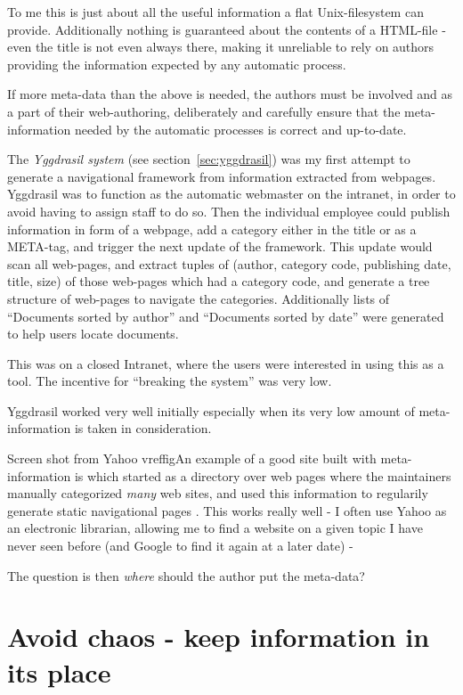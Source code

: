 To me this is just about all the useful information a flat
Unix-filesystem can provide.  Additionally nothing is guaranteed about
the contents of a HTML-file - even the title is not even always
there, making it unreliable to rely on authors providing the
information expected by any automatic process.

If more meta-data than the above is needed, the authors must be
involved and as a part of their web-authoring, deliberately and
carefully ensure that the meta-information needed by the automatic
processes is correct and up-to-date.

The \textit{Yggdrasil system} (see section~\vref{sec:yggdrasil}) was
my first attempt to generate a navigational framework from information
extracted from webpages.  Yggdrasil was to function as the automatic
webmaster on the intranet, in order to avoid having to assign staff to
do so.  Then the individual employee could publish information in form
of a webpage, add a category either in the title or as a META-tag, and
trigger the next update of the framework.  This update would scan all
web-pages, and extract tuples of (author, category code, publishing
date, title, size) of those web-pages which had a category code, and
generate a tree structure of web-pages to navigate the categories.
Additionally lists of ``Documents sorted by author'' and ``Documents
sorted by date'' were generated to help users locate documents.

This was on a closed Intranet, where the users were interested in
using this as a tool.  The incentive for ``breaking the system'' was
very low.

Yggdrasil worked very well initially especially when its very low
amount of meta-information is taken in consideration.

\textsf{Screen shot from Yahoo} \textsf{vref{fig}}An example of a good
site built with meta-information is
 which started as a directory over
web pages where the maintainers manually categorized \textit{many} web
sites, and used this information to regularily generate static
navigational pages .  This works really well - I often use Yahoo as an
electronic librarian, allowing me to find a website on a given topic I
have never seen before (and Google to find it again at a later date) - 

The question is then \textit{where} should the author put the meta-data?

\section{Avoid chaos - keep information in its place}


